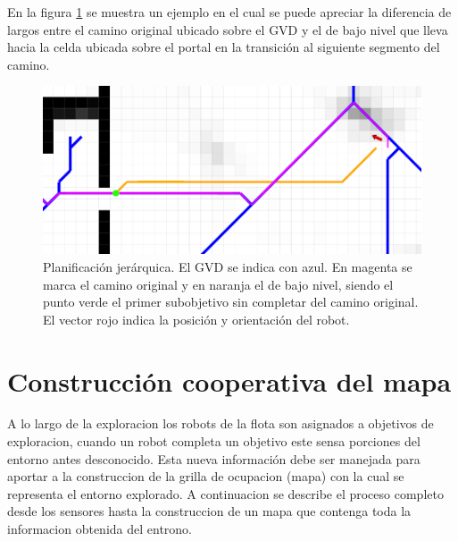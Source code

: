 En la figura \ref{fig:navjer} se muestra un ejemplo en el cual se puede
apreciar la diferencia de largos entre el camino original ubicado sobre
el GVD y el de bajo nivel que lleva hacia la celda ubicada sobre el
portal en la transición al siguiente segmento del camino.

\begin{figure}[H]
  \center
  \includegraphics[width=1\linewidth]{imagenes/navjer/caso1/a.png}
  \caption[Planificación jerárquica.]{Planificación jerárquica. El GVD
    se indica con azul. En magenta se marca el camino original y en
    naranja el de bajo nivel, siendo el punto verde el primer
    subobjetivo sin completar del camino original. El vector rojo indica
    la posición y orientación del robot.
 }
  \label{fig:navjer}
\end{figure} 


\section{Construcción cooperativa del mapa}



A lo largo de la exploracion los robots de la flota son asignados a objetivos
de exploracion, cuando un robot completa un objetivo este sensa porciones del
entorno antes desconocido. Esta nueva información debe ser manejada para
aportar a la construccion de la grilla de ocupacion (mapa) con la cual se
representa el entorno explorado. A continuacion se describe el proceso completo
desde los sensores hasta la construccion de un mapa que contenga toda la
informacion obtenida del entrono.

